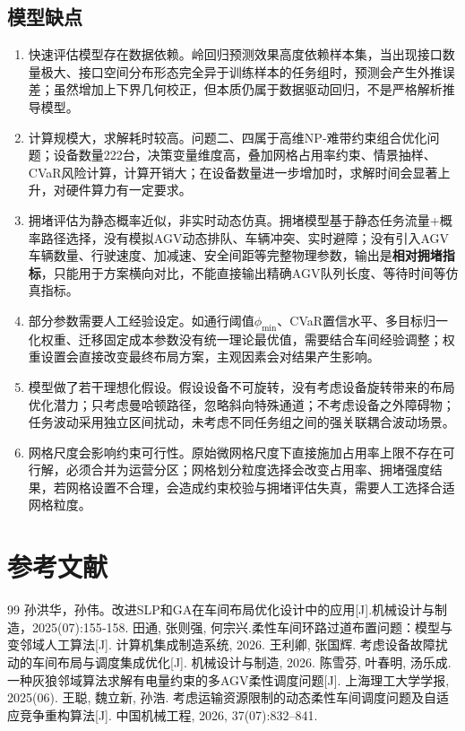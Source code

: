 \documentclass[12pt,a4paper]{article}
\begin{document}
	\subsection{模型缺点}
	\begin{enumerate}
		\item 快速评估模型存在数据依赖。岭回归预测效果高度依赖样本集，当出现接口数量极大、接口空间分布形态完全异于训练样本的任务组时，预测会产生外推误差；虽然增加上下界几何校正，但本质仍属于数据驱动回归，不是严格解析推导模型。
		\item 计算规模大，求解耗时较高。问题二、四属于高维NP‑难带约束组合优化问题；设备数量222台，决策变量维度高，叠加网格占用率约束、情景抽样、CVaR风险计算，计算开销大；在设备数量进一步增加时，求解时间会显著上升，对硬件算力有一定要求。
		\item 拥堵评估为静态概率近似，非实时动态仿真。拥堵模型基于静态任务流量+概率路径选择，没有模拟AGV动态排队、车辆冲突、实时避障；没有引入AGV车辆数量、行驶速度、加减速、安全间距等完整物理参数，输出是\textbf{相对拥堵指标}，只能用于方案横向对比，不能直接输出精确AGV队列长度、等待时间等仿真指标。
		\item 部分参数需要人工经验设定。如通行阈值$\phi_{\mathrm{min}}$、CVaR置信水平、多目标归一化权重、迁移固定成本参数没有统一理论最优值，需要结合车间经验调整；权重设置会直接改变最终布局方案，主观因素会对结果产生影响。
		\item 模型做了若干理想化假设。假设设备不可旋转，没有考虑设备旋转带来的布局优化潜力；只考虑曼哈顿路径，忽略斜向特殊通道；不考虑设备之外障碍物；任务波动采用独立区间扰动，未考虑不同任务组之间的强关联耦合波动场景。
		\item 网格尺度会影响约束可行性。原始微网格尺度下直接施加占用率上限不存在可行解，必须合并为运营分区；网格划分粒度选择会改变占用率、拥堵强度结果，若网格设置不合理，会造成约束校验与拥堵评估失真，需要人工选择合适网格粒度。
	\end{enumerate}
	

	\section{参考文献}
	\begin{thebibliography}{99}
	孙洪华，孙伟。改进SLP和GA在车间布局优化设计中的应用[J].机械设计与制造，2025(07):155‑158.
	田通, 张则强, 何宗兴.柔性车间环路过道布置问题：模型与变邻域人工算法[J]. 计算机集成制造系统, 2026.
	王利卿, 张国辉. 考虑设备故障扰动的车间布局与调度集成优化[J]. 机械设计与制造, 2026.
	陈雪芬, 叶春明, 汤乐成. 一种灰狼邻域算法求解有电量约束的多AGV柔性调度问题[J]. 上海理工大学学报, 2025(06).
	王聪, 魏立新, 孙浩. 考虑运输资源限制的动态柔性车间调度问题及自适应竞争重构算法[J]. 中国机械工程, 2026, 37(07):832--841.
	
	\end{thebibliography}
	
\end{document}
